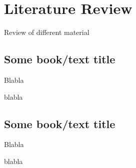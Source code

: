 \chapter{Literature Review}
Review of different material
\section{Some book/text title}
Blabla

blabla
\section{Some book/text title}
Blabla

blabla
